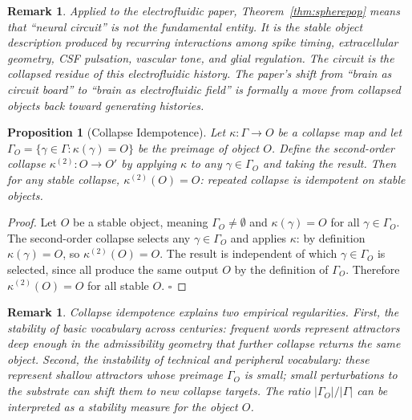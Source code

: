 \documentclass[12pt,a4paper]{article}
\newtheorem{proposition}[theorem]{Proposition}
\newtheorem{remark}[theorem]{Remark}
\begin{document}
\begin{remark}
Applied to the electrofluidic paper, Theorem~\ref{thm:spherepop} means that ``neural circuit'' is not the fundamental entity. It is the stable object description produced by recurring interactions among spike timing, extracellular geometry, CSF pulsation, vascular tone, and glial regulation. The circuit is the collapsed residue of this electrofluidic history. The paper's shift from ``brain as circuit board'' to ``brain as electrofluidic field'' is formally a move from collapsed objects back toward generating histories.
\end{remark}

\begin{proposition}[Collapse Idempotence]
\label{prop:idempotent}
Let $\kappa: \Gamma \to O$ be a collapse map and let $\Gamma_O = \{\gamma \in \Gamma : \kappa(\gamma) = O\}$ be the preimage of object $O$. Define the second-order collapse $\kappa^{(2)}: O \to O'$ by applying $\kappa$ to any $\gamma \in \Gamma_O$ and taking the result. Then for any stable collapse, $\kappa^{(2)}(O) = O$: repeated collapse is idempotent on stable objects.
\end{proposition}

\begin{proof}
Let $O$ be a stable object, meaning $\Gamma_O \neq \emptyset$ and $\kappa(\gamma) = O$ for all $\gamma \in \Gamma_O$. The second-order collapse selects any $\gamma \in \Gamma_O$ and applies $\kappa$: by definition $\kappa(\gamma) = O$, so $\kappa^{(2)}(O) = O$. The result is independent of which $\gamma \in \Gamma_O$ is selected, since all produce the same output $O$ by the definition of $\Gamma_O$. Therefore $\kappa^{(2)}(O) = O$ for all stable $O$. $\square$
\end{proof}

\begin{remark}
Collapse idempotence explains two empirical regularities. First, the stability of basic vocabulary across centuries: frequent words represent attractors deep enough in the admissibility geometry that further collapse returns the same object. Second, the instability of technical and peripheral vocabulary: these represent shallow attractors whose preimage $\Gamma_O$ is small; small perturbations to the substrate can shift them to new collapse targets. The ratio $|\Gamma_O|/|\Gamma|$ can be interpreted as a stability measure for the object $O$.
\end{remark}
\end{document}
